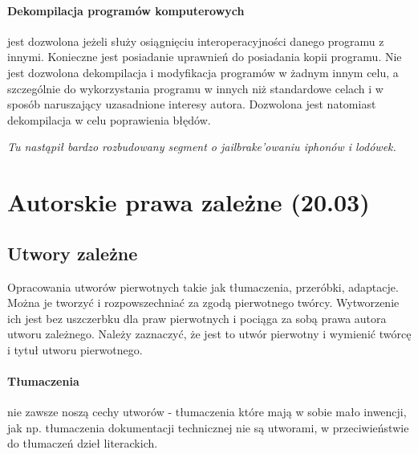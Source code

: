 \documentclass{article}
\begin{document}
\paragraph{Dekompilacja programów komputerowych}
jest dozwolona jeżeli służy osiągnięciu interoperacyjności danego programu z innymi.
Konieczne jest posiadanie uprawnień do posiadania kopii programu.
Nie jest dozwolona dekompilacja i modyfikacja programów w żadnym innym celu,
a szczególnie do wykorzystania programu w innych niż standardowe celach i w sposób naruszający uzasadnione interesy autora.
Dozwolona jest natomiast dekompilacja w celu poprawienia błędów.

\textit {
Tu nastąpił bardzo rozbudowany segment o jailbrake'owaniu iphonów i lodówek.
}

\section{Autorskie prawa zależne (20.03)}

\subsection{Utwory zależne}
Opracowania utworów pierwotnych takie jak tłumaczenia, przeróbki, adaptacje.
Można je tworzyć i rozpowszechniać za zgodą pierwotnego twórcy.
Wytworzenie ich jest bez uszczerbku dla praw pierwotnych i pociąga za sobą prawa autora utworu zależnego.
Należy zaznaczyć, że jest to utwór pierwotny i wymienić twórcę i tytuł utworu pierwotnego.

\paragraph{Tłumaczenia}
nie zawsze noszą cechy utworów - tłumaczenia które mają w sobie mało inwencji,
jak np. tłumaczenia dokumentacji technicznej nie są utworami, w przeciwieństwie do tłumaczeń dzieł literackich.
\end{document}
